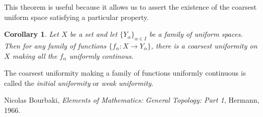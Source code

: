 \documentclass[12pt]{article}
\newtheorem*{corollary*}{Corollary}
\begin{document}
This theorem is useful because it allows us to assert the existence of the coarsest uniform space satisfying a particular property.

\begin{corollary*}
Let $X$ be a set and let $\{Y_{\alpha}\}_{\alpha\in I}$ be a family of uniform spaces.  Then for any family of functions $\{f_{\alpha}\colon X\to Y_{\alpha}\}$, there is a coarsest uniformity on $X$ making all the $f_{\alpha}$ uniformly continous.
\end{corollary*}

The coarsest uniformity making a family of functions uniformly continuous is called the \emph{initial uniformity} or \emph{weak uniformity}.

\begin{thebibliography}{9}
Nicolas Bourbaki, {\it Elements of Mathematics: General Topology: Part 1}, Hermann, 1966.
\end{thebibliography}

\end{document}
